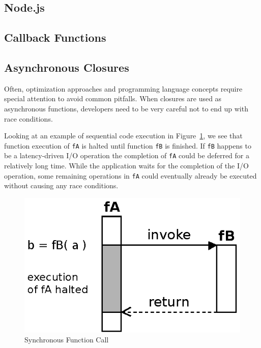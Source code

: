 \subsection{Node.js}



\subsection{Callback Functions}

\subsection{Asynchronous Closures}

%


Often, optimization approaches and programming language concepts require special attention to avoid common pitfalls.
When closures are used as asynchronous functions, developers need to be very careful not to end up with race conditions.


Looking at an example of sequential code execution in Figure~\ref{fig:Closures_Synchronous}, we see that function execution of \texttt{fA} is halted until function \texttt{fB} is finished.
If \texttt{fB} happens to be a latency-driven I/O operation the completion of \texttt{fA} could be deferred for a relatively long time.
While the application waits for the completion of the I/O operation, some remaining operations in \texttt{fA} could eventually already be executed without causing any race conditions.
\begin{figure}[!ht]
	\centering
  \includegraphics{figures/Closures_Synchronous}
	\caption{Synchronous Function Call}
	\label{fig:Closures_Synchronous}
\end{figure}


